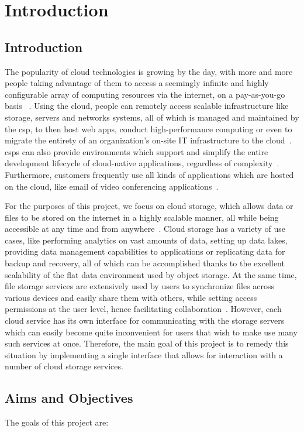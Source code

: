 \chapter{Introduction}

\section{Introduction}
The popularity of cloud technologies is growing by the day, with more and more people taking advantage of them to access a seemingly infinite and highly configurable array of computing resources via the internet, on a pay-as-you-go basis ~\cite{gvr}. Using the cloud, people can remotely access scalable infrastructure like storage, servers and networks systems, all of which is managed and maintained by the \ac{csp}, to then host web apps, conduct high-performance computing or even to migrate the entirety of an organization's on-site IT infrastructure to the cloud~\cite{iaas}. \ac{csp}s can also provide environments which support and simplify the entire development lifecycle of cloud-native applications, regardless of complexity~\cite{paas}. Furthermore, customers frequently use all kinds of applications which are hosted on the cloud, like email of video conferencing applications~\cite{saas}.

For the purposes of this project, we focus on cloud storage, which allows data or files to be stored on the internet in a highly scalable manner, all while being accessible at any time and from anywhere~\cite{s3_cloud_storage}. Cloud storage has a variety of use cases, like performing analytics on vast amounts of data, setting up data lakes, providing data management capabilities to applications or replicating data for backup and recovery, all of which can be accomplished thanks to the excellent scalability of the flat data environment used by object storage. At the same time, file storage services are extensively used by users to synchronize files across various devices and easily share them with others, while setting access permissions at the user level, hence facilitating collaboration~\cite{objectvsfile,objectvsfile2}. However, each cloud service has its own interface for communicating with the storage servers which can easily become quite inconvenient for users that wish to make use many such services at once. Therefore, the main goal of this project is to remedy this situation by implementing a single interface that allows for interaction with a number of cloud storage services.

\section{Aims and Objectives}
The goals of this project are:

